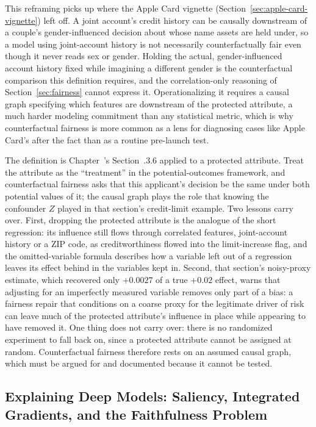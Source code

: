 \documentclass[../ai_in_finance]{subfiles}
\begin{document}
This reframing picks up where the Apple Card vignette (Section~\ref{sec:apple-card-vignette}) left off. A joint account's credit history can be causally downstream of a couple's gender-influenced decision about whose name assets are held under, so a model using joint-account history is not necessarily counterfactually fair even though it never reads sex or gender. Holding the actual, gender-influenced account history fixed while imagining a different gender is the counterfactual comparison this definition requires, and the correlation-only reasoning of Section~\ref{sec:fairness} cannot express it. Operationalizing it requires a causal graph specifying which features are downstream of the protected attribute, a much harder modeling commitment than any statistical metric, which is why counterfactual fairness is more common as a lens for diagnosing cases like Apple Card's after the fact than as a routine pre-launch test.

The definition is Chapter~'s Section~.3.6 applied to a protected attribute. Treat the attribute as the ``treatment'' in the potential-outcomes framework, and counterfactual fairness asks that this applicant's decision be the same under both potential values of it; the causal graph plays the role that knowing the confounder $Z$ played in that section's credit-limit example. Two lessons carry over. First, dropping the protected attribute is the analogue of the short regression: its influence still flows through correlated features, joint-account history or a ZIP code, as creditworthiness flowed into the limit-increase flag, and the omitted-variable formula describes how a variable left out of a regression leaves its effect behind in the variables kept in. Second, that section's noisy-proxy estimate, which recovered only $+0.0027$ of a true $+0.02$ effect, warns that adjusting for an imperfectly measured variable removes only part of a bias: a fairness repair that conditions on a coarse proxy for the legitimate driver of risk can leave much of the protected attribute's influence in place while appearing to have removed it. One thing does not carry over: there is no randomized experiment to fall back on, since a protected attribute cannot be assigned at random. Counterfactual fairness therefore rests on an assumed causal graph, which must be argued for and documented because it cannot be tested.

\subsection{Explaining Deep Models: Saliency, Integrated Gradients, and the Faithfulness Problem}
\label{sec:explaining-deep-models}
\end{document}
